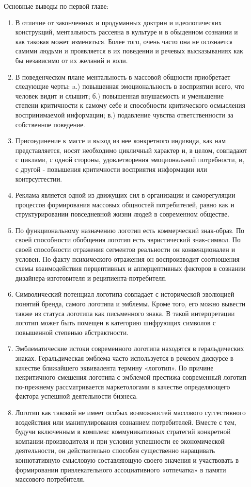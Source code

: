 Основные выводы по первой главе:\begin{enumerate}
\item В отличие от законченных и продуманных доктрин и идеологических конструкций,
ментальность рассеяна в культуре и в обыденном сознании и как таковая может изменяться. Более того, очень часто она не осознается самими людьми и  проявляется в их поведении и речевых высказываниях как бы независимо от их желаний и воли.
\item В поведенческом плане ментальность в массовой общности приобретает следующие черты: a.) повышенная эмоциональность в восприятии всего, что человек видит и слышит;
б.) повышенная внушаемость и  уменьшение степени критичности к самому себе и
способности критического осмысления воспринимаемой информации; в.) подавление чувства ответственности за собственное поведение.
\item Присоединение к массе и выход из нее конкретного индивида, как нам представляется, носят необходимо цикличный характер и, в целом, совпадают с циклами, с одной стороны,  удовлетворения эмоциональной потребности, и, с другой  - повышения критичности восприятия информации или контрсуггестии.
\item Реклама является одной из движущих сил в организации и  саморегуляции процессов формирования массовых общностей потребителей, равно как и структурировании повседневной жизни людей в современном обществе.
\item По функциональному назначению логотип есть коммерческий знак-образ. По своей способности обобщения логотип есть эвристический знак-символ. По своей способности отражения сегментов реальности он конвенционален и условен. По факту психического отражения он воспроизводит соотношения схемы взаимодействия перцептивных и апперцептивных факторов в сознании дизайнера-изготовителя и реципиента-потребителя.
\item Символический потенциал логотипа совпадает с исторической эволюцией понятий бренда, самого логотипа  и эмблемы. Кроме того, его можно вывести также из статуса логотипа как письменного знака. В такой интерпретации логотип может быть помещен в категорию шифрующих символов с повышенной степенью абстрактности.
\item Эмблематические истоки современного логотипа находятся в геральдических знаках. Геральдическая эмблема часто используется в речевом дискурсе в качестве ближайшего эквивалента термину «логотип».  По причине некритичного смешения логотипа с эмблемой престижа современный логотип по-прежнему рассматривается  маркетологами в качестве определяющего фактора успешной деятельности бизнеса.
\item Логотип как таковой не имеет особых возможностей массового суггестивного воздействия или манипулирования сознанием потребителей. Вместе с тем, будучи включенным в комплекс коммуникативных стратегий конкретной компании-производителя и при условии успешности ее экономической деятельности, он действительно способен существенно наращивать коннотативную смысловую составляющую своего значения и участвовать в формировании привлекательного ассоциативного «отпечатка» в памяти массового потребителя.
\end{enumerate}
